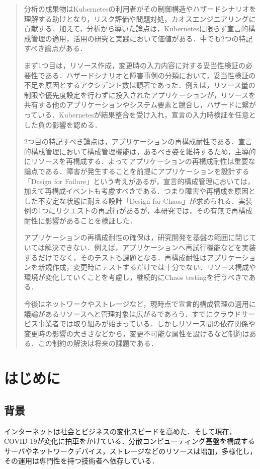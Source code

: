 \documentclass[12pt,a4j]{ujreport}
\begin{document}
\begin{abstract}
分析の成果物はKubernetesの利用者がその制御構造やハザードシナリオを理解する助けとなり，リスク評価や問題対処，カオスエンジニアリングに貢献する．加えて，分析から導いた論点は，Kubernetesに限らず宣言的構成管理の適用，活用の研究と実践において価値がある．中でも2つの特記すべき論点がある．

まず1つ目は，リソース作成，変更時の入力内容に対する妥当性検証の必要性である．ハザードシナリオと障害事例の分類において，妥当性検証の不足を原因とするアクシデント数は顕著であった．例えば，リソース量の制限や優先度設定を行わずに投入されたアプリケーションが，リソースを共有する他のアプリケーションやシステム要素と競合し，ハザードに繋がっている．Kubernetesが結果整合を受け入れ，宣言の入力時検証を任意とした負の影響を認める．

2つ目の特記すべき論点は，アプリケーションの再構成耐性である．宣言的構成管理において構成管理機能は，あるべき姿を維持するため，主導的にリソースを再構成する．よってアプリケーションの再構成耐性は重要な論点である．障害が発生することを前提にアプリケーションを設計する「Design for Failure」という考えがあるが，宣言的構成管理においては，加えて再構成イベントも考慮すべきである．つまり障害や再構成を原因とした不安定な状態に耐える設計「Design for Chaos」が求められる．実装例の1つにリクエストの再試行があるが，本研究では，その有無で再構成耐性に影響があることを検証した．

アプリケーションの再構成耐性の確保は，研究開発を基盤の範囲に閉じていては解決できない．例えば，アプリケーションへ再試行機能などを実装するだけでなく，そのテストも課題となる．再構成耐性はアプリケーションを新規作成，変更時にテストするだけでは十分でない．リソース構成や環境が変化していくことを考慮し，継続的にChaos testingを行うべきである．

今後はネットワークやストレージなど，現時点で宣言的構成管理の適用に議論があるリソースへと管理対象は広がるであろう．すでにクラウドサービス事業者では取り組みが始まっている．しかしリソース間の依存関係や変更時の影響の大きさなどから，変更不可能な属性を設けるなど制約はある．この制約の解決は将来の課題である．
\end{abstract}
\tableofcontents\thispagestyle{empty}
\listoffigures\thispagestyle{empty}
\listoftables\thispagestyle{empty}
\setcounter{page}{0}

\chapter{はじめに}

\section{背景}
インターネットは社会とビジネスの変化スピードを高めた．そして現在，COVID-19が変化に拍車をかけている．分散コンピューティング基盤を構成するサーバやネットワークデバイス，ストレージなどのリソースは増加，多様化し，その運用は専門性を持つ技術者へ依存している．
\end{document}
